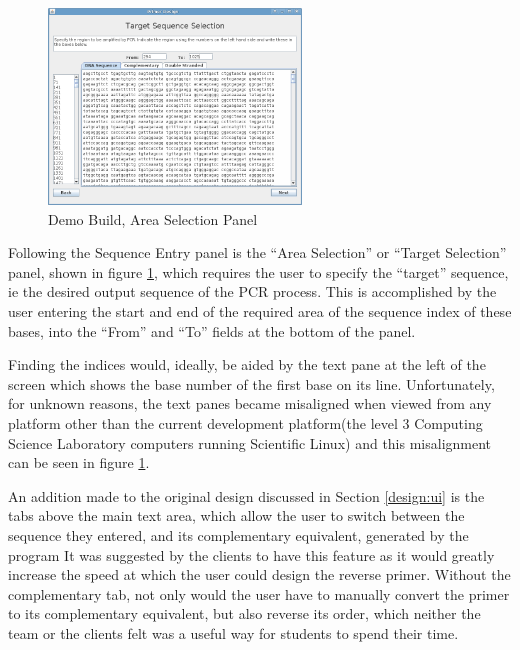 \begin{figure}[h]
  \begin{center}
    \includegraphics[width=0.6\textwidth]{./images/demoBuild/areaSelection.png}
    \caption{
      \label{fig:demoBuild:areaSelection}
      Demo Build, Area Selection Panel
    }
  \end{center}
\end{figure}

Following the Sequence Entry panel is the ``Area Selection'' or
``Target Selection'' panel, shown in figure
\ref{fig:demoBuild:areaSelection}, which requires the user to specify
the ``target'' sequence, ie the desired output sequence of the PCR
process.
This is accomplished by the user entering the start and end of the 
required area of the sequence index of these bases, into the ``From'' 
and ``To'' fields at the bottom of the panel.

Finding the indices would, ideally, be aided by the text pane at the 
left of the screen which shows the base number of the first base on its 
line. Unfortunately, for unknown reasons, the text panes became 
misaligned when viewed from any platform other than the current 
development platform(the level 3 Computing Science Laboratory computers
running Scientific Linux) and this misalignment can be seen in figure
\ref{fig:demoBuild:areaSelection}.

An addition made to the original design discussed in Section
\ref{design:ui} is the tabs above the main text area, which allow the
user to switch between the sequence they entered, and its
complementary equivalent, generated by the program
It was suggested by the clients to have this feature as it would
greatly increase the speed at which the user could design the reverse
primer.
Without the complementary tab, not only would the user have to
manually convert the primer to its complementary equivalent, but also
reverse its order, which neither the team or the clients felt was a
useful way for students to spend their time. 

